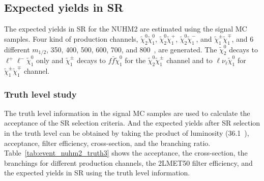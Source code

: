 \subsection{Expected yields in SR}
\label{subsec:event_expected_yields_in_SR}
The expected yields in SR for the NUHM2 are estimated using the signal MC samples.
Four kind  of production channels, $\widetilde{\chi}^{0}_{2} \widetilde{\chi}^{0}_{1}$, $\widetilde{\chi}^{0}_{2} \widetilde{\chi}^{+}_{1}$, $\widetilde{\chi}^{0}_{2} \widetilde{\chi}^{-}_{1}$, and $\widetilde{\chi}^{\pm}_{1} \widetilde{\chi}^{\mp}_{1}$, and 6 different $m_{1/2}$, 350, 400, 500, 600, 700, and 800~{\GeV}, are generated.
The $\widetilde{\chi}^{0}_{2}$ decays to $\ell^{+} \ell^{-} \widetilde{\chi}^{0}_{1}$ only and $\widetilde{\chi}^{\pm}_{1}$ decays to $f\bar{f} \widetilde{\chi}^{0}_{1}$ for the $\widetilde{\chi}^{0}_{2} \widetilde{\chi}^{\pm}_{1}$ channel and to $\ell \nu_{\ell} \widetilde{\chi}^{0}_{1}$ for $\widetilde{\chi}^{\pm}_{1} \widetilde{\chi}^{\mp}_{1}$ channel.


\subsubsection{Truth level study}
\label{subsubsec:event_truth_level_study}
The truth level information in the signal MC samples are used to calculate the acceptance of the SR selection criteria.
And the expected yields after SR selection in the truth level can be obtained by taking the product of luminosity (36.1~\ifb), acceptance, filter efficiency, cross-section, and the branching ratio.
Table~\ref{tab:event_nuhm2_truth3} shows the acceptance, the cross-section, the branchings for different production channels, the 2LMET50 filter efficiency, and the expected yields in SR using the truth level information.

